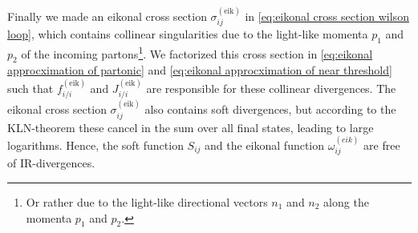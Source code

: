 Finally we made an eikonal cross section $\sigma_{ij}^{(\text{eik})}$ in \cref{eq:eikonal cross section wilson loop}, which contains collinear singularities due to the light-like momenta $p_1$ and $p_2$ of the incoming partons\footnote{Or rather due to the light-like directional vectors $n_{1}$ and $n_{2}$ along the momenta $p_1$ and $p_2$.}. We factorized this cross section in \cref{eq:eikonal approcximation of partonic} and \cref{eq:eikonal approcximation of near threshold} such that $f_{i/i}^{(\text{eik})}$ and $J_{i/i}^{(\text{eik})}$ are responsible for these collinear divergences. The eikonal cross section $\sigma_{ij}
^{(\text{eik})}$ also contains soft divergences, but according to the KLN-theorem these cancel in the sum over all final states, leading to large logarithms. Hence, the soft function $S_{ij}$ and the eikonal function $\omega_{ij}
^{(eik)}$ are free of IR-divergences. 